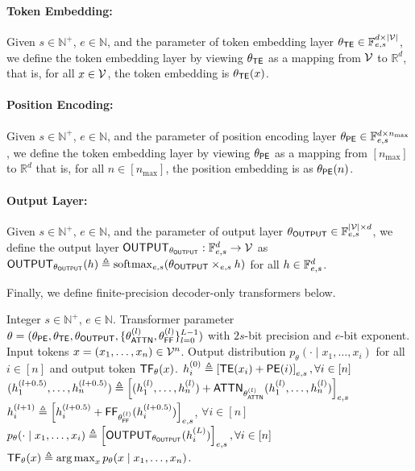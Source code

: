 \paragraph{Token Embedding:} Given $s\in\mathbb{N}^+$, $e\in\mathbb{N}$, and the parameter of token embedding layer $\theta_{\mathsf{TE}} \in  \mathbb{F}_{e,s} ^{d \times|{\mathcal{V}}|}$, we define the token embedding layer by viewing $\theta_{\mathsf{TE}}$ as a mapping from ${\mathcal{V}} $ to $ \mathbb{R}^d$, that is, for all $x\in {\mathcal{V}}$, the token embedding is $\theta_{\mathsf{TE}}(x)$. 

\paragraph{Position Encoding:}  Given $s\in\mathbb{N}^+$, $e\in\mathbb{N}$, and the parameter of position encoding layer $\theta_{\mathsf{PE}} \in  \mathbb{F}_{e,s} ^{d \times n_{\max}}$, we define the token embedding layer by viewing $\theta_{\mathsf{PE}}$ as a mapping from $[n_{\max}] $ to $ \mathbb{R}^d$ that is, for all $n\in [n_{\max}]$, the position embedding is as $\theta_{\mathsf{PE}}(n)$. 

\paragraph{Output Layer:} Given $s\in\mathbb{N}^+$, $e\in\mathbb{N}$, and the parameter of output layer $\theta_{\mathsf{OUTPUT}}  \in  \mathbb{F}_{e,s} ^{|{\mathcal{V}}| \times  d}$, we define the output layer $\mathsf{OUTPUT}_{\theta_{\mathsf{OUTPUT}}}: \mathbb{F}_{e,s} ^d \to {\mathcal{V}}$ as $\mathsf{OUTPUT}_{\theta_{\mathsf{OUTPUT}}}(h)\triangleq \mathrm{softmax}_{e,s}(\theta_{\mathsf{OUTPUT}}\times_{e,s} h)$ for all $h\in  \mathbb{F}_{e,s} ^d$. 

Finally, we define finite-precision decoder-only transformers below.

\begin{algorithm}[h]
\caption{Finite-precision Decoder-only Transformer, $\protect\transformer_\theta$ and $p_\theta$}\label{alg:defi_transformer_finite_precision}
\begin{algorithmic}[1]

\Require Integer $s\in\mathbb{N}^+$, $e\in\mathbb{N}$. Transformer parameter $\theta = (\theta_{\mathsf{PE}},\theta_{\mathsf{TE}},\theta_{\mathsf{OUTPUT}},\{\theta^{(l)}_{\mathsf{ATTN}},\theta^{(l)}_{\mathsf{FF}}\}_{l=0}^{L-1} )$ with $2s$-bit  precision and $e$-bit exponent. Input tokens $x= (x_1,\ldots, x_n)\in{\mathcal{V}}^n$.
\Ensure Output distribution $p_\theta(\cdot \mid x_1,\ldots, x_i)$ for all $i\in[n]$ and output token $\mathsf{TF}_\theta(x)$.
\State $h^{(0)}_i \triangleq \left[\mathsf{TE}(x_i) + \mathsf{PE}(i)\right]_{e,s}, \forall i \in [n]$
\State	$( h^{(l+0.5)}_1,\ldots, h^{(l+0.5)}_n) \triangleq  \left[(h^{(l)}_1,\ldots, h^{(l)}_n) +\mathsf{ATTN}_{\theta^{(l)}_{\mathsf{ATTN}}}(h^{(l)}_1,\ldots, h^{(l)}_n)\right]_{e,s} $
\State  $ h^{(l+1)}_i \triangleq \left[ h^{(l+0.5)}_i + \mathsf{FF}_{\theta^{(l)}_{\mathsf{FF}}}(h^{(l+0.5)}_i)\right]_{e,s}$, $\forall i \in [n]$
\EndFor
\State $p_\theta(\cdot\mid x_1,\ldots,x_i) \triangleq  \left[\mathsf{OUTPUT}_{\theta_{\mathsf{OUTPUT}}}(h^{(L)}_i)\right]_{e,s}, \forall i \in [n]$
\State $\mathsf{TF}_\theta(x)\triangleq \operatorname*{arg\,max}_{x} p_\theta(x\mid x_1,\ldots,x_n)$.
\end{algorithmic}
\end{algorithm}